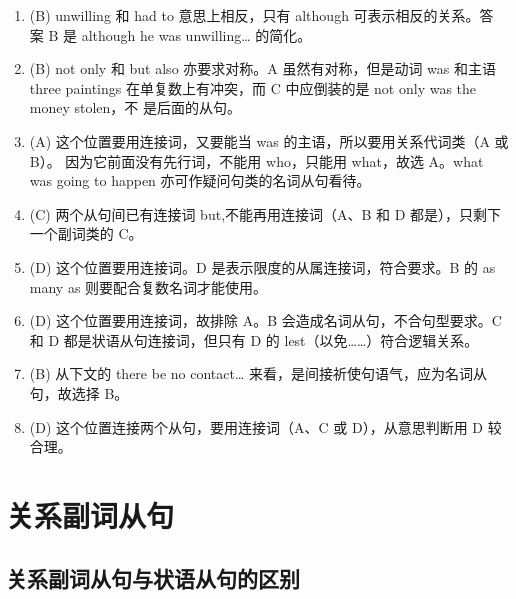 \begin{enumerate}
\item (B) unwilling 和 had to 意思上相反，只有 although 可表示相反的关系。答
  案 B 是 although he was unwilling… 的简化。

\item (B) not only 和 but also 亦要求对称。A 虽然有对称，但是动词 was 和主语 three
  paintings 在单复数上有冲突，而 C 中应倒装的是 not only was the money stolen，不
  是后面的从句。


\item (A) 这个位置要用连接词，又要能当 was 的主语，所以要用关系代词类（A 或 B）。
  因为它前面没有先行词，不能用 who，只能用 what，故选 A。what was going to
  happen 亦可作疑问句类的名词从句看待。

\item  (C) 两个从句间已有连接词 but,不能再用连接词（A、B 和 D 都是），只剩下一个副词类的 C。

\item (D) 这个位置要用连接词。D 是表示限度的从属连接词，符合要求。B 的 as many as 则要配合复数名词才能使用。
\item (D) 这个位置要用连接词，故排除 A。B 会造成名词从句，不合句型要求。C 和 D 都是状语从句连接词，但只有 D 的 lest（以免……）符合逻辑关系。
\item (B) 从下文的 there be no contact… 来看，是间接祈使句语气，应为名词从句，故选择 B。

\item (D) 这个位置连接两个从句，要用连接词（A、C 或 D），从意思判断用 D 较合理。
\end{enumerate}

\chapter{关系副词从句}
\label{chap:reladv}

\section{关系副词从句与状语从句的区别}

